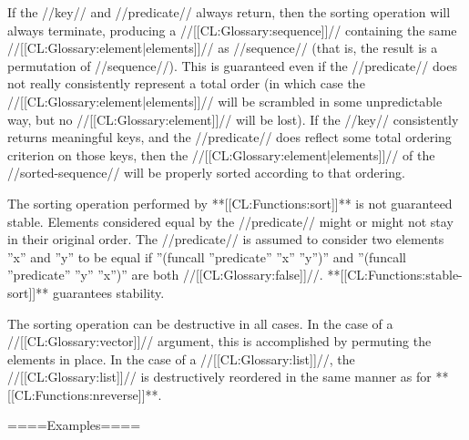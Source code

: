 If the //key// and //predicate// always return, then the sorting operation will always terminate, producing a //[[CL:Glossary:sequence]]// containing the same //[[CL:Glossary:element|elements]]// as //sequence// (that is, the result is a permutation of //sequence//). This is guaranteed even if the //predicate// does not really consistently represent a total order (in which case the //[[CL:Glossary:element|elements]]// will be scrambled in some unpredictable way, but no //[[CL:Glossary:element]]// will be lost). If the //key// consistently returns meaningful keys, and the //predicate// does reflect some total ordering criterion on those keys, then the //[[CL:Glossary:element|elements]]// of the //sorted-sequence// will be properly sorted according to that ordering.

The sorting operation performed by **[[CL:Functions:sort]]** is not guaranteed stable. Elements considered equal by the //predicate// might or might not stay in their original order. The //predicate// is assumed to consider two elements ''x'' and ''y'' to be equal if ''(funcall ''predicate'' ''x'' ''y'')'' and ''(funcall ''predicate'' ''y'' ''x'')'' are both //[[CL:Glossary:false]]//. **[[CL:Functions:stable-sort]]** guarantees stability.

The sorting operation can be destructive in all cases. In the case of a //[[CL:Glossary:vector]]// argument, this is accomplished by permuting the elements in place. In the case of a //[[CL:Glossary:list]]//, the //[[CL:Glossary:list]]// is destructively reordered in the same manner as for **[[CL:Functions:nreverse]]**.

====Examples====

